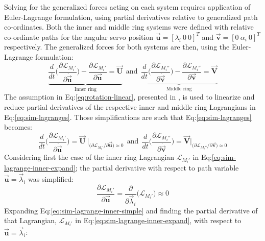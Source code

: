 Solving for the generalized forces acting on each system requires application of Euler-Lagrange formulation, using partial derivatives relative to generalized path co-ordinates. Both the inner and middle ring systems were defined with relative co-ordinate paths for the angular servo position $\vec{\mathbf{u}}=[\lambda_i~0~0]^T$ and $\vec{\mathbf{v}}=[0~\alpha_i~0]^T$ respectively. The generalized forces for both systems are then, using the Euler-Lagrange formulation:
\begin{equation}\label{eq:sim-lagranges}
\underbrace{\frac{d}{dt}\bigg(\frac{\partial\mathcal{L}_{M_i'}}{\partial\dot{\vec{\mathbf{u}}}}\bigg)-\frac{\partial\mathcal{L}_{M_i'}}{\partial\vec{\mathbf{u}}}=\vec{\mathbf{U}}}_{\text{Inner ring}}~~\text{and}~~\underbrace{\frac{d}{dt}\bigg(\frac{\partial\mathcal{L}_{M_i''}}{\partial\dot{\vec{\mathbf{v}}}}\bigg)-\frac{\partial\mathcal{L}_{M_i''}}{\partial\vec{\mathbf{v}}}=\vec{\mathbf{V}}}_{\text{Middle ring}}
\end{equation}
The assumption in Eq:\ref{eq:rotation-linear}, presented in \cite{rotationlinearize}, is used to linearize and reduce partial derivatives of the respective inner and middle ring Lagrangians in Eq:\ref{eq:sim-lagranges}. Those simplifications are such that Eq:\ref{eq:sim-lagranges} becomes:
\begin{equation}\label{eq:sim-lagranges-linear}
\frac{d}{dt}\bigg(\frac{\partial\mathcal{L}_{M_i'}}{\partial\dot{\vec{\mathbf{u}}}}\bigg)=\vec{\mathbf{U}}~\Big|_{\big(\partial\mathcal{L}_{M_i'}/\partial\vec{\mathbf{u}}\big)\approx 0}~~\text{and}~~\frac{d}{dt}\bigg(\frac{\partial\mathcal{L}_{M_i''}}{\partial\dot{\vec{\mathbf{v}}}}\bigg)=\vec{\mathbf{V}}\Big|_{\big(\partial\mathcal{L}_{M_i''}/\partial\vec{\mathbf{v}}\big)\approx 0}
\end{equation}
Considering first the case of the inner ring Lagrangian $\mathcal{L}_{M_i'}$ in Eq:\ref{eq:sim-lagrange-inner-expand}; the partial derivative with respect to path variable $\vec{\mathbf{u}}=\vec{\lambda}_i$ was simplified:
\begin{equation}\label{eq:sim-lagrange-inner-simple}
\frac{\partial\mathcal{L}_{M_i'}}{\partial\vec{\mathbf{u}}}=\frac{\partial}{\partial\vec{\lambda}_i}\big(\mathcal{L}_{M_i'}\big)\approx 0
\end{equation}
Expanding Eq:\ref{eq:sim-lagrange-inner-simple} and finding the partial derivative of that Lagrangian, $\mathcal{L}_{M_i'}$ in Eq:\ref{eq:sim-lagrange-inner-expand}, with respect to $\vec{\mathbf{u}}=\vec{\lambda}_i$:
